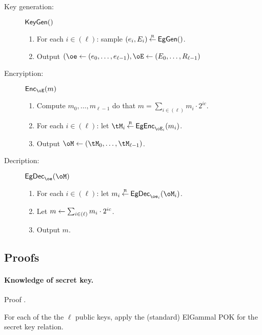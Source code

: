 \begin{description}
	\item[Key generation:] $\mathsf{KeyGen}()$ 
	\begin{enumerate}
		\item For each $i\in (\ell)$:	sample $(e_i,E_i) \mathbin{\stackrel{\mbox{\tiny R}}{\leftarrow}} \mathsf{EgGen}()$.
		
		\item Output $(\oe \asn (e_0,\ldots,e_{\ell-1}),\oE \asn (E_0,\ldots,R_{\ell-1})$
	\end{enumerate}

	
	\item[Encryiption:] $\Enc_{\oE}(m)$
	
	\begin{enumerate}
		\item Compute $m_0,\ldots,m_{\ell-1}$ do that $m =  \sum_{i \in (\ell)}   m_i \cdot 2^{i c}$.
		\item For each $i\in (\ell)$: let $\tM_i \getsr \EgEnc_{\oE_i}(m_i)$.
		
		\item Output $\oM \asn (\tM_0,\ldots, \tM_{\ell-1})$.
		
	\end{enumerate}
	 
	\item[Decription:] $\EgDec_{\oe}(\oM)$   
	\begin{enumerate}
		\item 	 For each $i\in (\ell)$: let $m_i \getsr \EgDec_{\oe_i}(\oM_i)$.
		
		\item Let  $m \leftarrow \sum_{i \in (\ell)}   m_i \cdot 2^{i c}$.
		
		\item Output $m$.
	\end{enumerate}
\end{description}



\subsection{Proofs}\label{sec:ChanksEG:Proofs}

\paragraph{Knowledge of secret key.}   Proof \piZKPOK{\rKeyGen}. 

For each of the  the $\ell$ public keys, apply the (standard) ElGammal POK for the secret key relation.


